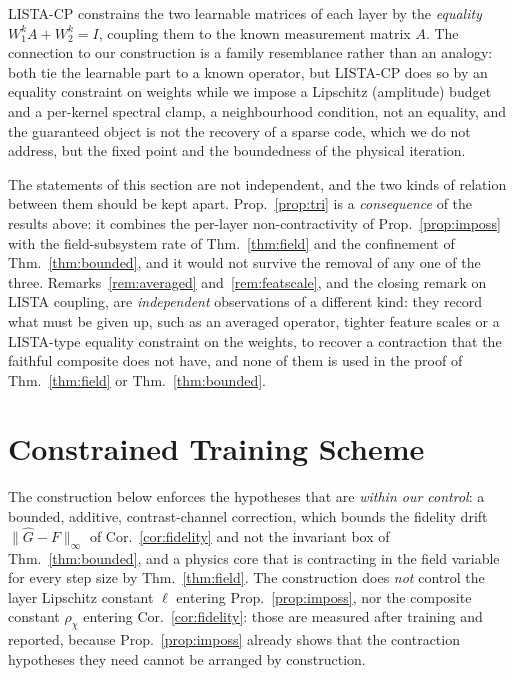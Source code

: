\documentclass[journal,cmes,article,submit,moreauthors,pdftex]{Definitions/tsp}
\newcommand{\norm}[1]{\lVert #1 \rVert}
\begin{document}
\begin{Remark}
LISTA-CP \cite{listacp} constrains the two learnable matrices of each layer by the
\emph{equality} $W_1^kA+W_2^k=I$, coupling them to the known measurement matrix $A$. The connection to our construction is a family resemblance rather than an analogy: both tie the learnable part to a known operator, but LISTA-CP does so by an equality
constraint on weights while we impose a Lipschitz (amplitude) budget and a per-kernel spectral
clamp, a neighbourhood condition, not an equality, and the guaranteed object is not the
recovery of a sparse code, which we do not address, but the fixed point and the boundedness of the
physical iteration.
\end{Remark}

The statements of this section are not independent, and the two kinds of relation between them
should be kept apart.
Prop.~\ref{prop:tri} is a \emph{consequence} of the results above: it combines the per-layer
non-contractivity of Prop.~\ref{prop:imposs} with the field-subsystem rate of
Thm.~\ref{thm:field} and the confinement of Thm.~\ref{thm:bounded}, and it would not survive the
removal of any one of the three. Remarks~\ref{rem:averaged} and~\ref{rem:featscale}, and the
closing remark on LISTA coupling, are \emph{independent} observations of a different kind: they record what must be given up, such as an averaged operator, tighter feature scales or a LISTA-type equality constraint on the weights, to recover a contraction that the faithful composite does
not have, and none of them is used in the proof of Thm.~\ref{thm:field} or
Thm.~\ref{thm:bounded}.

\section{Constrained Training Scheme}\label{sec:training}
The construction below enforces the hypotheses that are \emph{within our control}: a bounded, additive, contrast-channel correction, which bounds the fidelity drift $\norm{\hat G-F}_\infty$ of Cor.~\ref{cor:fidelity} and not the invariant box of Thm.~\ref{thm:bounded}, and a physics core that is contracting in the field variable for every step
size by Thm.~\ref{thm:field}. The construction does \emph{not} control the layer Lipschitz constant
$\ell$ entering Prop.~\ref{prop:imposs}, nor the composite constant $\rho_\chi$ entering
Cor.~\ref{cor:fidelity}: those are measured after training and reported, because
Prop.~\ref{prop:imposs} already shows that the contraction hypotheses they need cannot be arranged
by construction.
\end{document}
